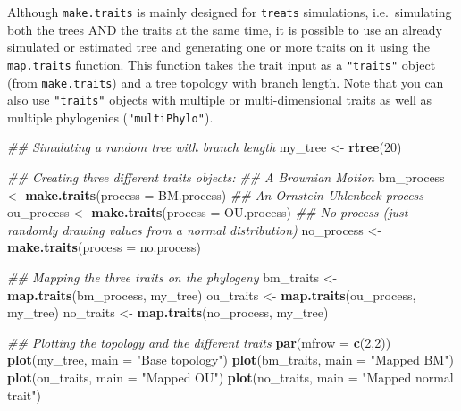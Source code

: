 \documentclass[
]{book}
\newenvironment{Shaded}{\begin{snugshade}}{\end{snugshade}}
\newcommand{\CommentTok}[1]{\textcolor[rgb]{0.56,0.35,0.01}{\textit{#1}}}
\newcommand{\DataTypeTok}[1]{\textcolor[rgb]{0.13,0.29,0.53}{#1}}
\newcommand{\DecValTok}[1]{\textcolor[rgb]{0.00,0.00,0.81}{#1}}
\newcommand{\KeywordTok}[1]{\textcolor[rgb]{0.13,0.29,0.53}{\textbf{#1}}}
\newcommand{\NormalTok}[1]{#1}
\newcommand{\StringTok}[1]{\textcolor[rgb]{0.31,0.60,0.02}{#1}}
\begin{document}
Although \texttt{make.traits} is mainly designed for \texttt{treats} simulations, i.e.~simulating both the trees AND the traits at the same time, it is possible to use an already simulated or estimated tree and generating one or more traits on it using the \texttt{map.traits} function. This function takes the trait input as a \texttt{"traits"} object (from \texttt{make.traits}) and a tree topology with branch length. Note that you can also use \texttt{"traits"} objects with multiple or multi-dimensional traits as well as multiple phylogenies (\texttt{"multiPhylo"}).

\begin{Shaded}
\begin{Highlighting}[]
\CommentTok{\#\# Simulating a random tree with branch length}
\NormalTok{my\_tree \textless{}{-}}\StringTok{ }\KeywordTok{rtree}\NormalTok{(}\DecValTok{20}\NormalTok{)}

\CommentTok{\#\# Creating three different traits objects:}
\CommentTok{\#\# A Brownian Motion}
\NormalTok{bm\_process \textless{}{-}}\StringTok{ }\KeywordTok{make.traits}\NormalTok{(}\DataTypeTok{process =}\NormalTok{ BM.process)}
\CommentTok{\#\# An Ornstein{-}Uhlenbeck process}
\NormalTok{ou\_process \textless{}{-}}\StringTok{ }\KeywordTok{make.traits}\NormalTok{(}\DataTypeTok{process =}\NormalTok{ OU.process)}
\CommentTok{\#\# No process (just randomly drawing values from a normal distribution)}
\NormalTok{no\_process \textless{}{-}}\StringTok{ }\KeywordTok{make.traits}\NormalTok{(}\DataTypeTok{process =}\NormalTok{ no.process)}

\CommentTok{\#\# Mapping the three traits on the phylogeny}
\NormalTok{bm\_traits \textless{}{-}}\StringTok{ }\KeywordTok{map.traits}\NormalTok{(bm\_process, my\_tree)}
\NormalTok{ou\_traits \textless{}{-}}\StringTok{ }\KeywordTok{map.traits}\NormalTok{(ou\_process, my\_tree)}
\NormalTok{no\_traits \textless{}{-}}\StringTok{ }\KeywordTok{map.traits}\NormalTok{(no\_process, my\_tree)}

\CommentTok{\#\# Plotting the topology and the different traits}
\KeywordTok{par}\NormalTok{(}\DataTypeTok{mfrow =} \KeywordTok{c}\NormalTok{(}\DecValTok{2}\NormalTok{,}\DecValTok{2}\NormalTok{))}
\KeywordTok{plot}\NormalTok{(my\_tree, }\DataTypeTok{main =} \StringTok{"Base topology"}\NormalTok{)}
\KeywordTok{plot}\NormalTok{(bm\_traits, }\DataTypeTok{main =} \StringTok{"Mapped BM"}\NormalTok{)}
\KeywordTok{plot}\NormalTok{(ou\_traits, }\DataTypeTok{main =} \StringTok{"Mapped OU"}\NormalTok{)}
\KeywordTok{plot}\NormalTok{(no\_traits, }\DataTypeTok{main =} \StringTok{"Mapped normal trait"}\NormalTok{)}
\end{Highlighting}
\end{Shaded}
\end{document}
